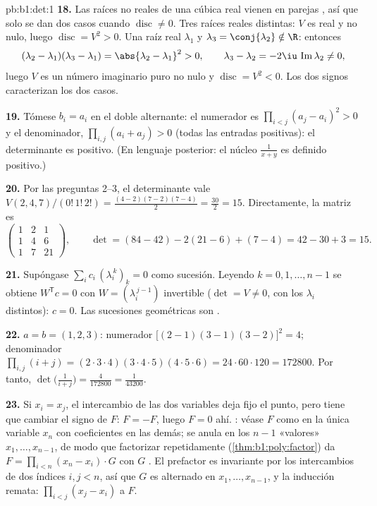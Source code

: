 \begin{solution}{pb:b1:det:1}
\textbf{18.} Las raíces no reales de una cúbica real vienen en
parejas , así que solo se dan dos casos cuando
$\operatorname{disc} \neq 0$. Tres raíces reales distintas: $V$ es
real y no nulo, luego $\operatorname{disc} = V^2 > 0$. Una raíz real
$\lambda_1$ y $\lambda_3 = \conj{\lambda_2} \notin \R$: entonces
\[
(\lambda_2 - \lambda_1)(\lambda_3 - \lambda_1) =
\abs{\lambda_2 - \lambda_1}^2 > 0,
\qquad
\lambda_3 - \lambda_2 = -2\iu\,\operatorname{Im}\lambda_2 \neq 0,
\]
luego $V$ es un número imaginario puro no nulo y
$\operatorname{disc} = V^2 < 0$. Los dos signos caracterizan los dos
casos.

\textbf{19.} Tómese $b_i = a_i$ en el doble alternante: el numerador
es $\prod_{i<j}(a_j - a_i)^2 > 0$ y el denominador,
$\prod_{i,j}(a_i + a_j) > 0$ (todas las entradas positivas): el
determinante es positivo. (En lenguaje posterior: el núcleo
$\frac1{x+y}$ es definido positivo.)

\textbf{20.} Por las preguntas 2--3, el determinante vale
$V(2,4,7)/(0!\,1!\,2!) = \frac{(4-2)(7-2)(7-4)}{2} =
\frac{30}{2} = 15$. Directamente, la matriz es
\[
\begin{pmatrix}
1 & 2 & 1\\
1 & 4 & 6\\
1 & 7 & 21
\end{pmatrix},
\qquad
\det = (84 - 42) - 2(21 - 6) + (7 - 4) = 42 - 30 + 3 = 15 .
\]

\textbf{21.} Supóngase $\sum_i c_i\,(\lambda_i^{\,k})_{k} = 0$ como
sucesión. Leyendo $k = 0, 1, \dots, n-1$ se obtiene
$W^{\mathsf T}c = 0$ con $W = (\lambda_i^{\,j-1})$ invertible
($\det = V \neq 0$, con los $\lambda_i$ distintos): $c = 0$. Las
sucesiones geométricas son .

\textbf{22.} $a = b = (1, 2, 3)$: numerador
$\bigl[(2-1)(3-1) (3-2)\bigr]^2 = 4$; denominador
$\prod_{i,j}(i + j) = (2\cdot3\cdot4)(3\cdot4\cdot5)(4\cdot5\cdot6)
= 24\cdot60\cdot120 = 172800$. Por tanto,
$\det\bigl(\frac1{i+j}\bigr) = \frac{4}{172800} = \frac1{43200}$.

\textbf{23.} Si $x_i = x_j$, el intercambio de las dos variables deja
fijo el punto, pero tiene que cambiar el signo de $F$: $F = -F$,
luego $F = 0$ ahí. : véase $F$ como  en la
única variable $x_n$ con coeficientes en las demás; se anula en los
$n - 1$ «valores» $x_1, \dots, x_{n-1}$, de modo que factorizar
repetidamente (\cref{thm:b1:poly:factor}) da
$F = \prod_{i<n}(x_n - x_i)\cdot G$ con $G$ . El prefactor
es invariante por los intercambios de dos índices $i, j < n$, así que
$G$ es alternado en $x_1, \dots, x_{n-1}$, y la inducción remata:
$\prod_{i<j}(x_j - x_i)$  a $F$.


\end{solution}

